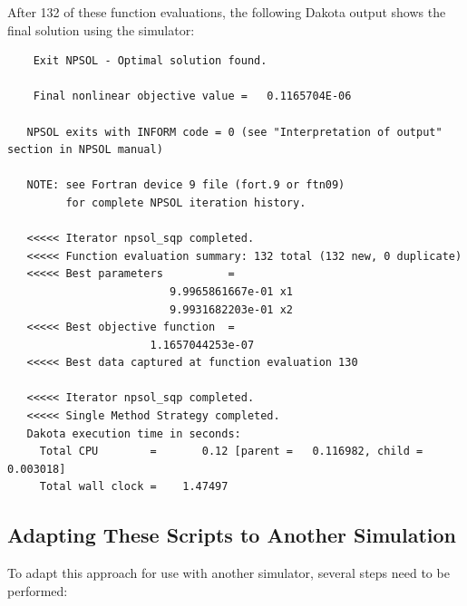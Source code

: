 After 132 of these function evaluations, the following Dakota output
shows the final solution using the  simulator:
\begin{footnotesize}
\begin{verbatim}
    Exit NPSOL - Optimal solution found.

    Final nonlinear objective value =   0.1165704E-06

   NPSOL exits with INFORM code = 0 (see "Interpretation of output" section in NPSOL manual)

   NOTE: see Fortran device 9 file (fort.9 or ftn09)
         for complete NPSOL iteration history.

   <<<<< Iterator npsol_sqp completed.
   <<<<< Function evaluation summary: 132 total (132 new, 0 duplicate)
   <<<<< Best parameters          =
                         9.9965861667e-01 x1
                         9.9931682203e-01 x2
   <<<<< Best objective function  =
                      1.1657044253e-07
   <<<<< Best data captured at function evaluation 130

   <<<<< Iterator npsol_sqp completed.
   <<<<< Single Method Strategy completed.
   Dakota execution time in seconds:
     Total CPU        =       0.12 [parent =   0.116982, child =   0.003018]
     Total wall clock =    1.47497
\end{verbatim}
\end{footnotesize}

\subsection{Adapting These Scripts to Another Simulation}

To adapt this approach for use with another simulator, several steps
need to be performed:

